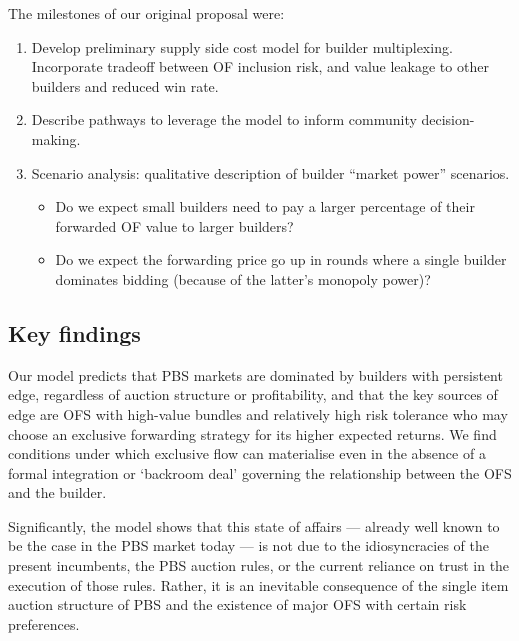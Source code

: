 The milestones of our original proposal were:
%
\begin{enumerate}
  \item 
    Develop preliminary supply side cost model for builder multiplexing. 
    Incorporate tradeoff between OF inclusion risk, and value leakage to other builders and reduced win rate.

  \item
    Describe pathways to leverage the model to inform community decision-making.

  \item
    Scenario analysis: qualitative description of builder ``market power'' scenarios.
    \begin{itemize}
      \item Do we expect small builders need to pay a larger percentage of their forwarded OF value to larger builders?
      \item Do we expect the forwarding price go up in rounds where a single builder dominates bidding (because of the latter's monopoly power)?
    \end{itemize}

\end{enumerate}

\subsection*{Key findings}

Our model predicts that PBS markets are dominated by builders with persistent edge, regardless of auction structure or profitability, and that the key sources of edge are OFS with high-value bundles and relatively high risk tolerance who may choose an exclusive forwarding strategy for its higher expected returns.
%
We find conditions under which exclusive flow can materialise even in the absence of a formal integration or `backroom deal' governing the relationship between the OFS and the builder.

Significantly, the model shows that this state of affairs --- already well known to be the case in the PBS market today --- is not due to the idiosyncracies of the present incumbents, the PBS auction rules, or the current reliance on trust in the execution of those rules.
%
Rather, it is an inevitable consequence of the single item auction structure of PBS and the existence of major OFS with certain risk preferences.

